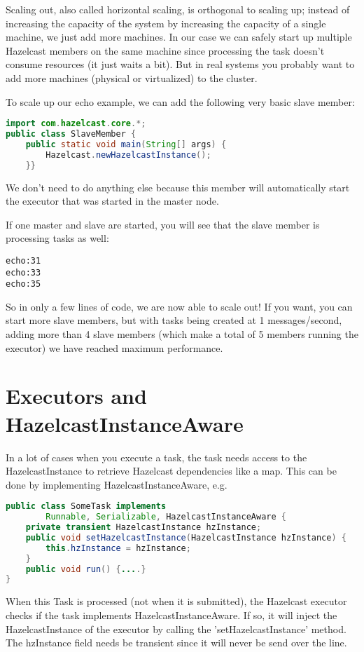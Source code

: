 Scaling out, also called horizontal scaling, is orthogonal to scaling up; instead of increasing the capacity of the system by increasing the capacity of a single machine, we just add more machines. In our case we can safely start up multiple Hazelcast members on the same machine since processing the task doesn't consume resources (it just waits a bit). But in real systems you probably want to add more machines (physical or virtualized) to the cluster.

To scale up our echo example, we can add the following very basic slave member:
\begin{lstlisting}[language=java]
import com.hazelcast.core.*;
public class SlaveMember {
    public static void main(String[] args) {
        Hazelcast.newHazelcastInstance();
    }}
\end{lstlisting}
We don't need to do anything else because this member will automatically start the executor that was started in the master node.

If one master and slave are started, you will see that the slave member is processing tasks as well:
\begin{lstlisting}
echo:31
echo:33
echo:35	
\end{lstlisting}
So in only a few lines of code, we are now able to scale out! If you want, you can start more slave members, but with tasks being created at 1 messages/second, adding more than 4 slave members (which make a total of 5 members running the executor) we have reached maximum performance. 

\section{Executors and HazelcastInstanceAware}
In a lot of cases when you execute a task, the task needs access to the HazelcastInstance to retrieve Hazelcast dependencies like a map. This can be done by implementing HazelcastInstanceAware, e.g.

\begin{lstlisting}[language=java]
public class SomeTask implements
        Runnable, Serializable, HazelcastInstanceAware {
    private transient HazelcastInstance hzInstance;
    public void setHazelcastInstance(HazelcastInstance hzInstance) {
        this.hzInstance = hzInstance;
    }
    public void run() {....}
}
\end{lstlisting}
When this Task is processed (not when it is submitted), the Hazelcast executor checks if the task implements HazelcastInstanceAware. If so, it will inject the HazelcastInstance of the executor by calling the 'setHazelcastInstance' method. The hzInstance field needs be transient since it will never be send over the line. 


